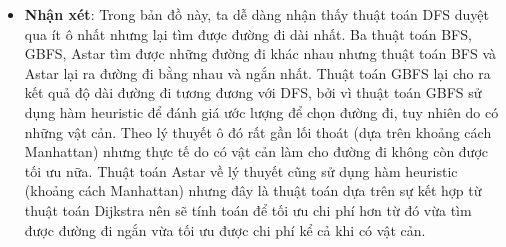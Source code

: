 \documentclass[11pt]{scrartcl} %
\begin{document}
\begin{itemize}
\begin{figure}[h]
\begin{tabular}{cc}
		\end{tabular}
	\end{figure}
	\begin{itemize}
		\item \textbf{Nhận xét}: Trong bản đồ này, ta dễ dàng nhận thấy thuật toán DFS duyệt qua ít ô nhất nhưng lại tìm được đường đi dài nhất. Ba thuật toán BFS, GBFS, Astar tìm được những đường đi khác nhau nhưng thuật toán BFS và Astar lại ra đường đi bằng nhau và ngắn nhất. Thuật toán GBFS lại cho ra kết quả độ dài đường đi tương đương với DFS, bởi vì thuật toán GBFS sử dụng hàm heuristic để đánh giá ước lượng để chọn đường đi, tuy nhiên do có những vật cản. Theo lý thuyết ô đó rất gần lối thoát (dựa trên khoảng cách Manhattan) nhưng thực tế do có vật cản làm cho đường đi không còn được tối ưu nữa. Thuật toán Astar về lý thuyết cũng sử dụng hàm heuristic (khoảng cách Manhattan) nhưng đây là thuật toán dựa trên sự kết hợp từ thuật toán Dijkstra nên sẽ tính toán để tối ưu chi phí hơn từ đó vừa tìm được đường đi ngắn vừa tối ưu được chi phí kể cả khi có vật cản.
	\end{itemize}
\end{itemize}





\end{document}
